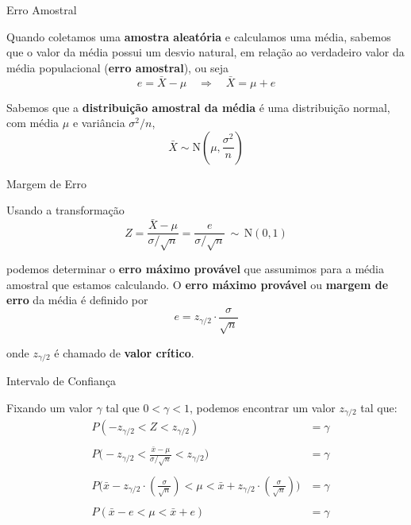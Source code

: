 \documentclass[14pt,aspectratio=1610]{beamer}
\begin{document}
\begin{frame}{Erro Amostral}
    \begin{block}{}
    \justifying
    Quando coletamos uma \textbf{amostra aleatória} e calculamos uma média, sabemos que o valor da média possui um desvio natural, em relação ao verdadeiro valor da média populacional (\textbf{erro amostral}), ou seja
$$
e = \bar{X} - \mu \quad \Rightarrow \quad \bar{X} = \mu + e
$$

Sabemos que a \textbf{distribuição amostral da média} é uma distribuição normal, com média $\mu$ e variância
$\sigma^2/n$,
$$
\bar{X} \sim \text{N}\left(\mu, \frac{\sigma^2}{n}\right)
$$

    \end{block}
\end{frame}

\begin{frame}{Margem de Erro}
    \begin{block}{}
    \justifying
    Usando a transformação
$$
Z = \frac{\bar{X} - \mu}{\sigma/\sqrt{n}} =
\frac{e}{\sigma/\sqrt{n}} \, \sim \, \text{N}(0,1)
$$

podemos determinar o \textbf{erro máximo provável} que
assumimos para a média amostral que estamos calculando.
O \textbf{erro máximo provável} ou \textbf{margem de erro} da média é definido por
$$
e = z_{\gamma/2} \cdot \frac{\sigma}{\sqrt{n}}
$$

onde $z_{\gamma/2}$ é chamado de \textbf{valor crítico}.
    \end{block}
\end{frame}

\begin{frame}{Intervalo de Confiança}
\vspace{-0.3cm}
    \begin{block}{}
    \justifying
Fixando um valor $\gamma$ tal que $0 < \gamma < 1$, podemos encontrar um valor $z_{\gamma/2}$ tal que:
\vspace{-0.3cm}
\begin{align*}
&P(-z_{\gamma/2} < Z < z_{\gamma/2}) &= \gamma \\
\\
&P\Big(-z_{\gamma/2} < \frac{\bar{x} - \mu}{\sigma/\sqrt{n}} <
z_{\gamma/2}\Big) &= \gamma \\
\\
&P\Big(\bar{x} - z_{\gamma/2} \cdot
\left(\frac{\sigma}{\sqrt{n}} \right) < \mu < \bar{x} + z_{\gamma/2}
\cdot \left(\frac{\sigma}{\sqrt{n}} \right)\Big) &= \gamma \\
\\
&P(\bar{x} - e < \mu < \bar{x} + e) &= \gamma 
\end{align*}
    \end{block}
\end{frame}
\end{document}
